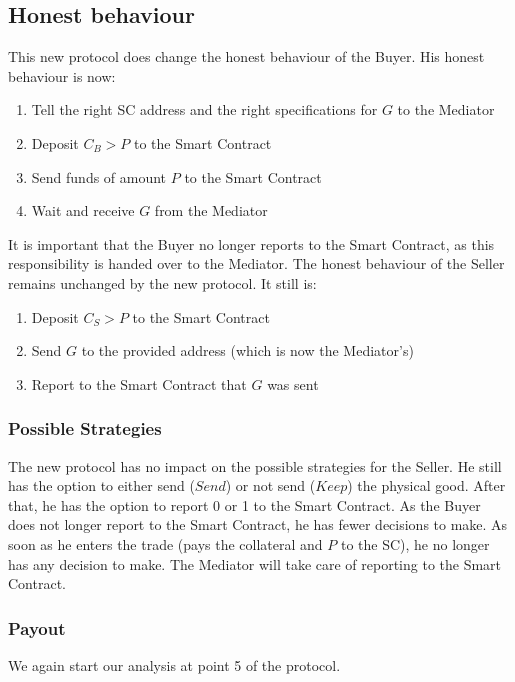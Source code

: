 \documentclass{cacthesis}
\begin{document}
\subsection{Honest behaviour}
This new protocol does change the honest behaviour of the Buyer. His honest behaviour is now:
\begin{enumerate}
    \item Tell the right SC address and the right specifications for $G$ to the Mediator
    \item Deposit $C_B>P$ to the Smart Contract
    \item Send funds of amount $P$ to the Smart Contract
    \item Wait and receive $G$ from the Mediator
\end{enumerate}
It is important that the Buyer no longer reports to the Smart Contract, as this responsibility is handed over to the Mediator.\newline
The honest behaviour of the Seller remains unchanged by the new protocol. It still is:
\begin{enumerate}
    \item Deposit $C_S>P$ to the Smart Contract
    \item Send $G$ to the provided address (which is now the Mediator's)
    \item Report to the Smart Contract  that $G$ was sent
\end{enumerate}

\subsubsection{Possible Strategies}
The new protocol has no impact on the possible strategies for the Seller. He still has the option to either send ($Send$) or not send ($Keep$) the physical good. After that, he has the option to report 0 or 1 to the Smart Contract.\newline
As the Buyer does not longer report to the Smart Contract, he has fewer decisions to make. As soon as he enters the trade (pays the collateral and $P$ to the SC), he no longer has any decision to make. The Mediator will take care of reporting to the Smart Contract.

\subsubsection{Payout}
We again start our analysis at point 5 of the protocol.\newline
\end{document}
